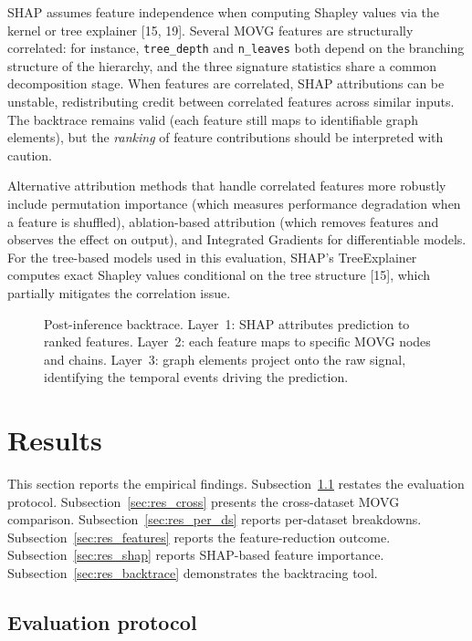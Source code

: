 \documentclass[a4paper,12pt]{article}
\begin{document}
SHAP assumes feature independence when computing Shapley values via the kernel or tree explainer [15, 19]. Several MOVG features are structurally correlated: for instance, \texttt{tree\_depth} and \texttt{n\_leaves} both depend on the branching structure of the hierarchy, and the three signature statistics share a common decomposition stage. When features are correlated, SHAP attributions can be unstable, redistributing credit between correlated features across similar inputs. The backtrace remains valid (each feature still maps to identifiable graph elements), but the \emph{ranking} of feature contributions should be interpreted with caution.

Alternative attribution methods that handle correlated features more robustly include permutation importance (which measures performance degradation when a feature is shuffled), ablation-based attribution (which removes features and observes the effect on output), and Integrated Gradients for differentiable models. For the tree-based models used in this evaluation, SHAP's TreeExplainer computes exact Shapley values conditional on the tree structure [15], which partially mitigates the correlation issue.

\begin{figure}[H]
    \centering
    \caption{Post-inference backtrace. Layer~1: SHAP attributes prediction to ranked features. Layer~2: each feature maps to specific MOVG nodes and chains. Layer~3: graph elements project onto the raw signal, identifying the temporal events driving the prediction.}
    \label{fig:backtrace}
\end{figure}


\section{Results}
\label{sec:results}

This section reports the empirical findings. Subsection~\ref{sec:res_protocol} restates the evaluation protocol. Subsection~\ref{sec:res_cross} presents the cross-dataset MOVG comparison. Subsection~\ref{sec:res_per_ds} reports per-dataset breakdowns. Subsection~\ref{sec:res_features} reports the feature-reduction outcome. Subsection~\ref{sec:res_shap} reports SHAP-based feature importance. Subsection~\ref{sec:res_backtrace} demonstrates the backtracing tool.

\subsection{Evaluation protocol}
\label{sec:res_protocol}
\end{document}
